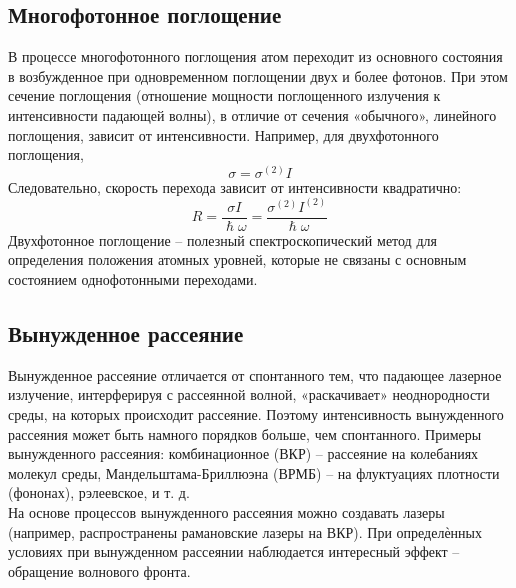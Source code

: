 \subsection*{Многофотонное поглощение}
В процессе многофотонного поглощения атом переходит из основного состояния в возбужденное при одновременном поглощении двух и более фотонов. При этом сечение поглощения (отношение мощности поглощенного излучения к интенсивности падающей волны), в отличие от сечения «обычного», линейного поглощения, зависит от интенсивности. Например, для двухфотонного поглощения,
\begin{equation}\label{2photon}
\sigma = \sigma^{(2)}I
\end{equation}
Следовательно, скорость перехода зависит от интенсивности квадратично:
\begin{equation}\label{2photon1}
R = \frac{\sigma I}{ \hslash \omega } =  \frac{\sigma^{(2)}I^{(2)}}{\hslash\omega}
\end{equation}
Двухфотонное поглощение – полезный спектроскопический метод для определения положения атомных уровней, которые не связаны с основным состоянием однофотонными переходами.

\subsection*{Вынужденное рассеяние}
Вынужденное рассеяние отличается от спонтанного тем, что падающее лазерное излучение, интерферируя с рассеянной волной, «раскачивает» неоднородности среды, на которых происходит рассеяние. Поэтому интенсивность вынужденного рассеяния может быть намного порядков больше, чем спонтанного. Примеры вынужденного рассеяния: комбинационное (ВКР) – рассеяние на колебаниях молекул среды, Мандельштама-Бриллюэна (ВРМБ) – на флуктуациях плотности (фононах), рэлеевское, и т. д.
\\
На основе процессов вынужденного рассеяния можно создавать лазеры (например, распространены рамановские лазеры на ВКР). При определѐнных условиях при вынужденном рассеянии наблюдается интересный эффект – обращение волнового фронта.

